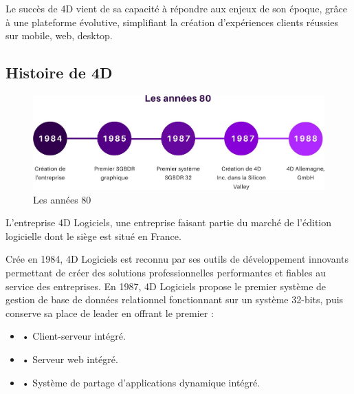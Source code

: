 Le succès de 4D vient de sa capacité à répondre aux enjeux de son époque, grâce à
une plateforme évolutive, simplifiant la création d’expériences clients réussies sur mobile,
web, desktop.\\



\subsection{Histoire de 4D}


\begin{figure}[h]
    \centering
    \includegraphics[scale=0.3]{Figures/80.jpg} %
    \caption{Les années 80}
    \label{fig:Histoire80}
\end{figure}

L’entreprise 4D Logiciels, une entreprise faisant partie du marché de l’édition logicielle
dont le siège est situé en France.
\newline



Crée en 1984, 4D Logiciels est reconnu par ses outils de développement innovants permettant de créer des solutions professionnelles performantes et fiables au service des entreprises.
En 1987, 4D Logiciels propose le premier système de gestion de base de données relationnel fonctionnant sur un système 32-bits, puis conserve sa place de leader en offrant le premier :
\begin{itemize}
    \item • Client-serveur intégré.
    \item • Serveur web intégré.
    \item • Système de partage d’applications dynamique intégré.
\end{itemize}
\vspace{1cm}

